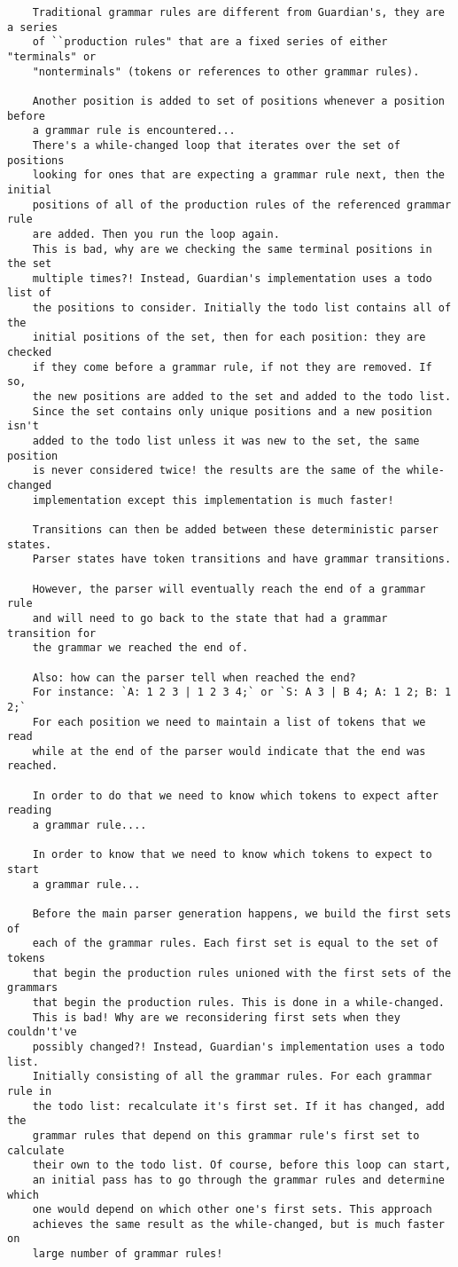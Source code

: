{\begin{verbatim}
	Traditional grammar rules are different from Guardian's, they are a series
	of ``production rules" that are a fixed series of either "terminals" or
	"nonterminals" (tokens or references to other grammar rules).
	
	Another position is added to set of positions whenever a position before
	a grammar rule is encountered...
	There's a while-changed loop that iterates over the set of positions
	looking for ones that are expecting a grammar rule next, then the initial
	positions of all of the production rules of the referenced grammar rule
	are added. Then you run the loop again.
	This is bad, why are we checking the same terminal positions in the set
	multiple times?! Instead, Guardian's implementation uses a todo list of
	the positions to consider. Initially the todo list contains all of the
	initial positions of the set, then for each position: they are checked
	if they come before a grammar rule, if not they are removed. If so,
	the new positions are added to the set and added to the todo list.
	Since the set contains only unique positions and a new position isn't
	added to the todo list unless it was new to the set, the same position
	is never considered twice! the results are the same of the while-changed
	implementation except this implementation is much faster!

	Transitions can then be added between these deterministic parser states.
	Parser states have token transitions and have grammar transitions.

	However, the parser will eventually reach the end of a grammar rule
	and will need to go back to the state that had a grammar transition for
	the grammar we reached the end of.

	Also: how can the parser tell when reached the end?
	For instance: `A: 1 2 3 | 1 2 3 4;` or `S: A 3 | B 4; A: 1 2; B: 1 2;`
	For each position we need to maintain a list of tokens that we read
	while at the end of the parser would indicate that the end was reached.

	In order to do that we need to know which tokens to expect after reading
	a grammar rule....

	In order to know that we need to know which tokens to expect to start
	a grammar rule...

	Before the main parser generation happens, we build the first sets of
	each of the grammar rules. Each first set is equal to the set of tokens
	that begin the production rules unioned with the first sets of the grammars
	that begin the production rules. This is done in a while-changed.
	This is bad! Why are we reconsidering first sets when they couldn't've
	possibly changed?! Instead, Guardian's implementation uses a todo list.
	Initially consisting of all the grammar rules. For each grammar rule in
	the todo list: recalculate it's first set. If it has changed, add the
	grammar rules that depend on this grammar rule's first set to calculate
	their own to the todo list. Of course, before this loop can start,
	an initial pass has to go through the grammar rules and determine which
	one would depend on which other one's first sets. This approach
	achieves the same result as the while-changed, but is much faster on
	large number of grammar rules!


\end{verbatim}}

